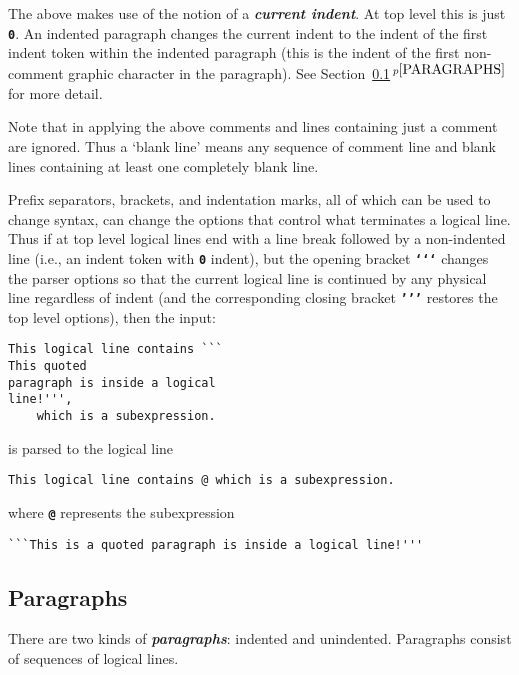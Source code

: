 \documentclass[12pt]{article}
\newcommand{\TT}[1]{{\tt \bfseries #1}}
\newcommand{\key}[1]{{\bf \em #1}\index{#1}}
\newcommand{\skey}[2]{{\bf \em #1#2}\index{#1}}
\newcommand{\itemref}[1]{\ref{#1}$\,^{p\pageref{#1}}$}
\newenvironment{indpar}[1][0.3in]%
	{\begin{list}{}%
		     {\setlength{\itemsep}{0in}%
		      \setlength{\topsep}{0in}%
		      \setlength{\parsep}{1ex}%
		      \setlength{\labelwidth}{#1}%
		      \setlength{\leftmargin}{#1}%
		      \addtolength{\leftmargin}{\labelsep}}%
	 \item}%
	{\end{list}}
\begin{document}
The above makes use of the notion of a \key{current indent}.  At top
level this is just \TT{0}.  An indented paragraph changes the current
indent to the indent of the first indent token within the indented
paragraph (this is the indent of the first non-comment graphic character
in the paragraph).  See
Section~\itemref{PARAGRAPHS} for more detail.

Note that in applying the above comments and lines containing
just a comment are ignored.  Thus a `blank line' means any sequence
of comment line and blank lines containing at least one completely
blank line.

Prefix separators, brackets, and indentation marks, all of which
can be used to change syntax, can change the options that control
what terminates a logical line.  Thus if at top level logical
lines end with a line break followed by a non-indented line
(i.e., an indent token with \TT{0} indent),
but the opening bracket \TT{`{}`{}`} changes the parser options so that
the current logical line is continued by any physical line regardless of
indent (and the corresponding closing bracket \TT{'{}'{}'} restores
the top level options), then the input:
\begin{indpar}\begin{verbatim}
This logical line contains ```
This quoted
paragraph is inside a logical
line!''',
    which is a subexpression.
\end{verbatim}\end{indpar}

is parsed to the logical line
\begin{indpar}\begin{verbatim}
This logical line contains @ which is a subexpression.
\end{verbatim}\end{indpar}

where \TT{@} represents the subexpression

\begin{indpar}\begin{verbatim}
```This is a quoted paragraph is inside a logical line!'''
\end{verbatim}\end{indpar}

\subsection{Paragraphs}
\label{PARAGRAPHS}

There are two kinds of \skey{paragraph}s: indented and unindented.
Paragraphs consist of sequences of logical lines.
\end{document}
